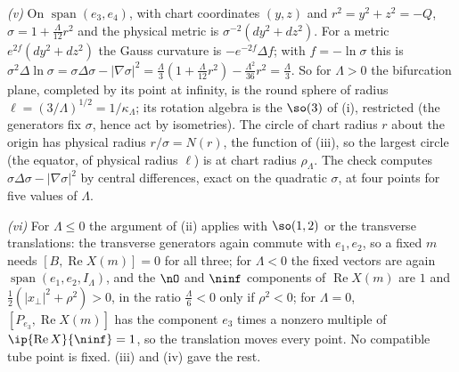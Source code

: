 \emph{(v)} On $\operatorname{span}(e_{3}, e_{4})$, with chart coordinates $(y, z)$ and $r^{2} = y^{2} + z^{2} = -Q$, $\sigma = 1 + \tfrac{\Lambda}{12}r^{2}$ and the physical metric is $\sigma^{-2}(dy^{2} + dz^{2})$. For a metric $e^{2f}(dy^{2} + dz^{2})$ the Gauss curvature is $-e^{-2f}\Delta f$; with $f = -\ln\sigma$ this is $\sigma^{2}\Delta\ln\sigma = \sigma\Delta\sigma - |\nabla\sigma|^{2} = \tfrac{\Lambda}{3}(1 + \tfrac{\Lambda}{12}r^{2}) - \tfrac{\Lambda^{2}}{36}r^{2} = \tfrac{\Lambda}{3}$. So for $\Lambda > 0$ the bifurcation plane, completed by its point at infinity, is the round sphere of radius $\ell = (3/\Lambda)^{1/2} = 1/\kappa_{\Lambda}$; its rotation algebra is the $\so(3)$ of (i), restricted (the generators fix $\sigma$, hence act by isometries). The circle of chart radius $r$ about the origin has physical radius $r/\sigma = N(r)$, the function of (iii), so the largest circle (the equator, of physical radius $\ell$) is at chart radius $\rho_{\Lambda}$. The check computes $\sigma\Delta\sigma - |\nabla\sigma|^{2}$ by central differences, exact on the quadratic $\sigma$, at four points for five values of $\Lambda$.

\emph{(vi)} For $\Lambda \le 0$ the argument of (ii) applies with $\so(1,2)$ or the transverse translations: the transverse generators again commute with $e_{1}, e_{2}$, so a fixed $m$ needs $[B, \operatorname{Re}X(m)] = 0$ for all three; for $\Lambda < 0$ the fixed vectors are again $\operatorname{span}(e_{1}, e_{2}, I_{\Lambda})$, and the $\nO$ and $\ninf$ components of $\operatorname{Re}X(m)$ are $1$ and $\tfrac12(|x_{\perp}|^{2} + \rho^{2}) > 0$, in the ratio $\tfrac{\Lambda}{6} < 0$ only if $\rho^{2} < 0$; for $\Lambda = 0$, $[P_{e_{3}}, \operatorname{Re}X(m)]$ has the component $e_{3}$ times a nonzero multiple of $\ip{\operatorname{Re}X}{\ninf} = 1$, so the translation moves every point. No compatible tube point is fixed. (iii) and (iv) gave the rest.

